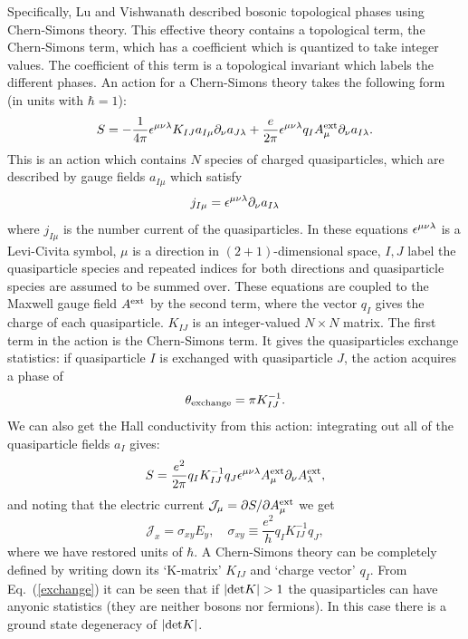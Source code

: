 Specifically, Lu and Vishwanath described bosonic topological phases using Chern-Simons theory. This effective theory contains a topological term, the Chern-Simons term, which has a coefficient which is quantized to take integer values. The coefficient of this term is a topological invariant which labels the different phases. An action for a Chern-Simons theory takes the following form (in units with $\hbar=1$):\cite{Wen_book}
\begin{equation}
S=-\frac{1}{4\pi}\epsilon^{\mu\nu\lambda} K_{IJ}a_{I\mu}\partial_{\nu}a_{J\lambda} +\frac{e}{2\pi}\epsilon^{\mu\nu\lambda} q_IA^{\rm ext}_{\mu}\partial_\nu a_{I\lambda}.
\label{chernsimons}
\end{equation}
This is an action which contains $N$ species of charged quasiparticles, which are described by gauge fields $a_{I\mu}$ which satisfy 
\begin{equation}
j_{I\mu}=\epsilon^{\mu\nu\lambda} \partial_\nu a_{I\lambda}
\end{equation}
where $j_{I\mu}$ is the number current of the quasiparticles. In these equations $\epsilon^{\mu\nu\lambda}$ is a Levi-Civita symbol, $\mu$ is a direction in $(2+1)$-dimensional space, $I,J$ label the quasiparticle species and repeated indices for both directions and quasiparticle species are assumed to be summed over. These equations are coupled to the Maxwell gauge field $A^{\rm ext}$ by the second term, where the vector $q_I$ gives the charge of each quasiparticle. $K_{IJ}$ is an integer-valued $N\times N$ matrix. The first term in the action is the Chern-Simons term. It gives the quasiparticles exchange statistics: if quasiparticle $I$ is exchanged with quasiparticle $J$, the action acquires a phase of 
\begin{equation}
\theta_{\rm exchange}=\pi K_{IJ}^{-1}.
\label{exchange}
\end{equation}
 We can also get the Hall conductivity from this action: integrating out all of the quasiparticle fields $a_I$ gives:
\begin{equation}
S=\frac{e^2}{2\pi} q_I K_{IJ}^{-1} q_J \epsilon^{\mu\nu\lambda} A^{\rm ext}_\mu \partial_\nu A^{\rm ext}_\lambda,
\label{externalCS}
\end{equation}
and noting that the electric current $\mathcal{J}_\mu=\partial S/\partial A^{\rm ext}_\mu$ we get
\begin{equation}
\mathcal{J}_x=\sigma_{xy} E_y,\quad \sigma_{xy}\equiv \frac{e^2}{h}q_I K_{IJ}^{-1} q_J,
\end{equation}
where we have restored units of $\hbar$. A Chern-Simons theory can be completely defined by writing down its `K-matrix' $K_{IJ}$ and `charge vector' $q_I$. From Eq.~(\ref{exchange}) it can be seen that if $|{\rm det}K|>1$ the quasiparticles can have anyonic statistics (they are neither bosons nor fermions). In this case there is a ground state degeneracy of $|{\rm det}K|$. 

